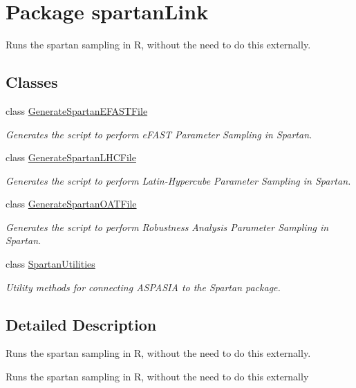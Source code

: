 \hypertarget{namespacespartanLink}{}\section{Package spartan\+Link}
\label{namespacespartanLink}


Runs the spartan sampling in R, without the need to do this externally.  


\subsection*{Classes}
\begin{DoxyCompactItemize}
\item 
class \hyperlink{classspartanLink_1_1GenerateSpartanEFASTFile}{Generate\+Spartan\+E\+F\+A\+S\+T\+File}
\begin{DoxyCompactList}\small\item\em Generates the script to perform e\+F\+A\+S\+T Parameter Sampling in Spartan. \end{DoxyCompactList}\item 
class \hyperlink{classspartanLink_1_1GenerateSpartanLHCFile}{Generate\+Spartan\+L\+H\+C\+File}
\begin{DoxyCompactList}\small\item\em Generates the script to perform Latin-\/\+Hypercube Parameter Sampling in Spartan. \end{DoxyCompactList}\item 
class \hyperlink{classspartanLink_1_1GenerateSpartanOATFile}{Generate\+Spartan\+O\+A\+T\+File}
\begin{DoxyCompactList}\small\item\em Generates the script to perform Robustness Analysis Parameter Sampling in Spartan. \end{DoxyCompactList}\item 
class \hyperlink{classspartanLink_1_1SpartanUtilities}{Spartan\+Utilities}
\begin{DoxyCompactList}\small\item\em Utility methods for connecting A\+S\+P\+A\+S\+I\+A to the Spartan package. \end{DoxyCompactList}\end{DoxyCompactItemize}


\subsection{Detailed Description}
Runs the spartan sampling in R, without the need to do this externally. 

Runs the spartan sampling in R, without the need to do this externally 